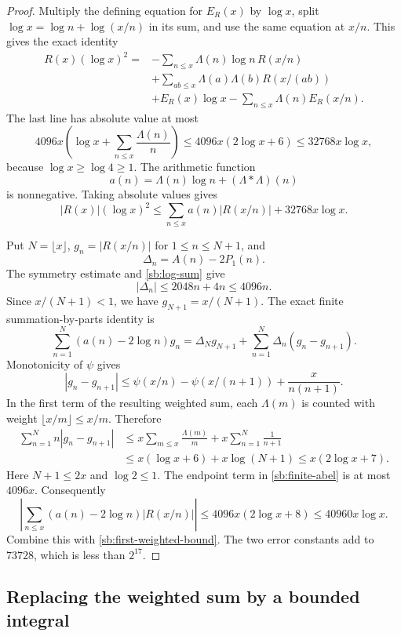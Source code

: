 \begin{proof}
Multiply the defining equation for $E_R(x)$ by $\log x$, split
$\log x=\log n+\log(x/n)$ in its sum, and use the same equation at
$x/n$.  This gives the exact identity
\begin{align*}
 R(x)(\log x)^2={}&
   -\sum_{n\le x}\Lambda(n)\log n\,R(x/n)\\
 &+\sum_{ab\le x}\Lambda(a)\Lambda(b)R(x/(ab))\\
 &+E_R(x)\log x-\sum_{n\le x}\Lambda(n)E_R(x/n).
\end{align*}
The last line has absolute value at most
\[
 4096x\left(\log x+\sum_{n\le x}\frac{\Lambda(n)}n\right)
 \le4096x(2\log x+6)
 \le32768x\log x,
\]
because $\log x\ge\log4\ge1$.  The arithmetic function
\[
 a(n)=\Lambda(n)\log n+(\Lambda*\Lambda)(n)
\]
is nonnegative.  Taking absolute values gives
\begin{equation}
 |R(x)|(\log x)^2
    \le\sum_{n\le x}a(n)|R(x/n)|+32768x\log x.
 \label{sb:first-weighted-bound}
\end{equation}

Put $N=\lfloor x\rfloor$, $g_n=|R(x/n)|$ for $1\le n\le N+1$,
and
\[
 \Delta_n=A(n)-2P_1(n).
\]
The symmetry estimate and \eqref{sb:log-sum} give
\[
 |\Delta_n|\le2048n+4n\le4096n.
\]
Since $x/(N+1)<1$, we have $g_{N+1}=x/(N+1)$.  The exact finite
summation-by-parts identity is
\begin{equation}
 \sum_{n=1}^N(a(n)-2\log n)g_n
   =\Delta_Ng_{N+1}
       +\sum_{n=1}^N\Delta_n(g_n-g_{n+1}).
 \label{sb:finite-abel}
\end{equation}
Monotonicity of $\psi$ gives
\[
 |g_n-g_{n+1}|
 \le\psi(x/n)-\psi(x/(n+1))+\frac{x}{n(n+1)}.
\]
In the first term of the resulting weighted sum, each $\Lambda(m)$
is counted with weight $\lfloor x/m\rfloor\le x/m$.  Therefore
\begin{align*}
 \sum_{n=1}^N n|g_n-g_{n+1}|
 &\le x\sum_{m\le x}\frac{\Lambda(m)}m
                   +x\sum_{n=1}^N\frac1{n+1}\\
 &\le x(\log x+6)+x\log(N+1)
 \le x(2\log x+7).
\end{align*}
Here $N+1\le2x$ and $\log2\le1$.  The endpoint term in
\eqref{sb:finite-abel} is at most $4096x$.  Consequently
\[
 \left|\sum_{n\le x}(a(n)-2\log n)|R(x/n)|\right|
 \le4096x(2\log x+8)\le40960x\log x.
\]
Combine this with \eqref{sb:first-weighted-bound}.  The two error
constants add to $73728$, which is less than $2^{17}$.
\end{proof}

\subsection{Replacing the weighted sum by a bounded integral}
\label{sb:sum-integral-subsection}

